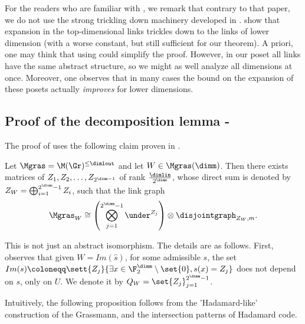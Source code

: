 \begin{remark}
    For the readers who are familiar with \cite{Golowich2023}, we remark that contrary to that paper, we do not use the strong trickling down machinery developed in \cite{kaufmanT2021garland}. \cite{kaufmanT2021garland} show that expansion in the top-dimensional links trickles down to the links of lower dimension (with a worse constant, but still sufficient for our theorem). A priori, one may think that using \cite{kaufmanT2021garland} could simplify the proof. However, in our poset all links have the same abstract structure, so we might as well analyze all dimensions at once. Moreover, one observes that in many cases the bound on the expansion of these posets actually \emph{improves} for lower dimensions.
\end{remark}

\subsection{Proof of the decomposition lemma - } \label{sec:proof-of-decomp-lemma}
The proof of  uses the following claim proven in \cite{Golowich2023}. %

\begin{claim} 
    Let \(\Mgras = \M(\Gr)^{\leq \dimlout}\) and let \(W \in \Mgras(\dimm)\). Then there exists matrices of \(Z_1,Z_2,\dots,Z_{2^{\dimm-1}}\) of rank \(\frac{\dimlin}{2^\dimm}\), whose direct sum is denoted by \(Z_W = \bigoplus_{i=1}^{2^\dimm - 1}Z_i\), such that the link graph 
    \[\Mgras_W \cong  \left ( \bigotimes_{j=1}^{2^\dimm -1} \under^{Z_j} \right ) \otimes \disjointgraph_{Z_W,m}.\]
\end{claim}
This is not just an abstract isomorphism. The details are as follows. First, \cite{Golowich2023} observes that given \(W = Im(\widehat{s})\), for some admissible \(s\), the set \(Im(s) \coloneqq \sett{Z_j}{\exists x \in \F_2^\dimm \setminus \set{0}, s(x)=Z_j}\) does not depend on \(s\), only on \(U\). We denote it by \(Q_W = \set{Z_j}_{j=1}^{2^\dimm-1}\).
%

Intuitively, the following proposition follows from the 'Hadamard-like' construction of the Grassmann, and the intersection patterns of Hadamard code.

